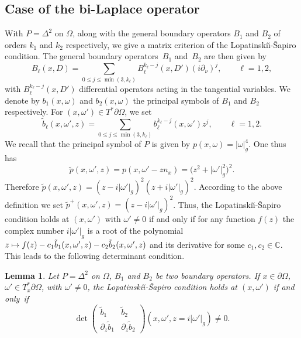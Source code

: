 \documentclass[JEP,XML,SOM,Unicode,published]{cedram}
\newcommand\mto{\mathchoice{\longmapsto}{\mapsto}{\mapsto}{\mapsto}}
\theoremstyle{plain}
\newtheorem{lemma}[theorem]{Lemma}
\theoremstyle{definition}
\def\C{\mathbb{C}}
\newcommand{\LS}{Lopatinski\u{\i}-\v{S}apiro\xspace}
\begin{document}
\subsection{Case of the bi-Laplace operator}
\label{sec: LS for bi-Laplace}
With $P=\Delta^2$ on $\Omega$, along with the general boundary operators $B_1$ and $B_2$ of orders $k_1$ and $k_2$ respectively, we give a matrix criterion of the \LS condition. The general boundary operators~$B_1$ and~$B_2$ are then given by
\begin{equation*}
B_\ell(x,D)
= \sum_{0\leq j\leq\min(3,k_\ell)}
B_\ell^{k_\ell-j}(x,D') (i \partial_\nu) ^j,
\qquad \ell=1,2,
\end{equation*}
with $B_\ell^{k_\ell-j}(x,D')$ differential operators acting in the
tangential variables.
We denote by $b_1(x,\omega)$ and $b_2(x,\omega)$ the principal symbols of $B_1$ and $B_2$ respectively. For $(x,\omega')\in T^*\partial\Omega$, we set
\begin{equation*}
\tilde{b}_\ell(x,\omega',z)
=\sum_{0\leq j\leq \min(3,k_\ell)}
b_\ell^{k_\ell-j}(x,\omega')z^j,
\qquad \ell=1,2.
\end{equation*}
We recall that the principal symbol of $P$ is given by
$p(x,\omega)=|\omega|^4_g$. One thus has
\begin{equation*}
\tilde{p}(x,\omega',z)=p(x,\omega'-zn_x) = \big(z^2 + |\omega'|_g^2\big)^2.
\end{equation*}
Therefore
$\tilde{p}(x,\omega',z)=(z-i|\omega'|_g)^2(z+i|\omega'|_g)^2$. According
to the above definition we set
$\tilde{p}^+(x,\omega',z)=(z-i|\omega'|_g)^2$. Thus, the
\LS condition holds at $(x,\omega')$ with $\omega'\neq 0$ if
and only if for any function $f(z)$ the complex number $i|\omega'|_g$
is a root of the polynomial $z\mto
f(z)-c_1\tilde{b}_1(x,\omega',z)-c_2\tilde{b}_2(x,\omega',z)$ and its
derivative for some $c_1,c_2\in\C$. This leads to the
following determinant condition.

\begin{lemma}\label{lemma: Lopatinskii bi-laplacian op}
Let $P=\Delta^2$ on $\Omega$, $B_1$ and $B_2$ be two boundary
operators. If $x \in \partial\Omega$, $\omega' \in T_x^* \partial\Omega$, with
$\omega' \neq 0$, the \LS
condition holds at $(x,\omega')$ if and only~if
\begin{equation}\label{cond1}
\det
\begin{pmatrix}
\tilde{b}_1 &\tilde{b}_2 \\[
2pt]
\partial_z\tilde{b}_1& \partial_z\tilde{b}_2
\end{pmatrix} (x,\omega',z=i|\omega'|_g)
\neq 0.
\end{equation}
\end{lemma}
\end{document}
